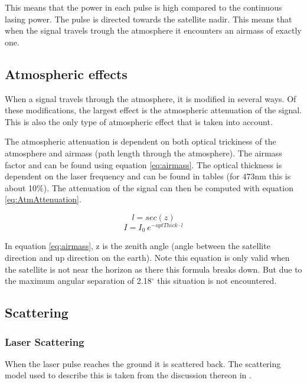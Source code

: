 This means that the power in each pulse is high compared to the continuous lasing power. The pulse is directed towards the satellite nadir. This means that when the signal travels trough the atmosphere it encounters an airmass of exactly one.

\subsection{Atmospheric effects}

When a signal travels through the atmosphere, it is modified in several ways. Of these modifications, the largest effect is the atmospheric attenuation of the signal. This is also the only type of atmospheric effect that is taken into account.

The atmospheric attenuation is dependent on both optical trickiness of the atmosphere and airmass (path length through the atmosphere). The airmass factor and can be found using equation \ref{eq:airmass}. The optical thickness is dependent on the laser frequency and can be found in tables (for 473nm this is about 10\%). The attenuation of the signal can then be computed with equation \ref{eq:AtmAttenuation}.

\begin{equation}
	l = sec (z)
	\label{eq:airmass}
\end{equation}
\begin{equation}
	I = I_0 \: e^{ -optThick \cdot l }
	\label{eq:AtmAttenuation}
\end{equation}

In equation \ref{eq:airmass}, z is the zenith angle (angle between the satellite direction and up direction on the earth). Note this equation is only valid when the satellite is not near the horizon as there this formula breaks down. But due to the maximum angular separation of 2.18$^\circ$ this situation is not encountered.

\subsection{Scattering}
\subsubsection{Laser Scattering}

When the laser pulse reaches the ground it is scattered back. The scattering model used to describe this is taken from the discussion thereon in \cite{rees}. 

